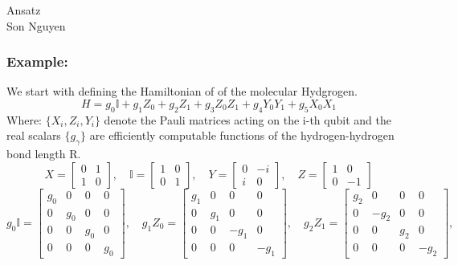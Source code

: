 \documentclass{article}
\begin{document}
\begin{center}
	\LARGE{Ansatz}\\[1em]
	\large Son Nguyen\\[1em]
\end{center}

\subsubsection*{Example:}
We start with defining the Hamiltonian of of the molecular Hydgrogen.
\[H = g_0 \mathbb{I} + g_1 Z_0 + g_2 Z_1 + g_3 Z_0 Z_1 + g_4 Y_0 Y_1 + g_5 X_0 X_ 1\]
Where: $\{X_i, Z_i, Y_i\}$ denote the Pauli matrices acting on the i-th qubit and the real scalars $\{g_\gamma\}$ are efficiently computable functions of the hydrogen-hydrogen bond length R.
\[
	X = \begin{bmatrix}
		0 & 1 \\
		1 & 0
	\end{bmatrix} , \quad
	\mathbb{I} = \begin{bmatrix}
		1 & 0 \\
		0 & 1
	\end{bmatrix}, \quad
	Y = \begin{bmatrix}
		0 & -i \\
		i & 0
	\end{bmatrix}, \quad
	Z = \begin{bmatrix}
		1 & 0  \\
		0 & -1
	\end{bmatrix}
\]
\[g_0 \mathbb{I} = \begin{bmatrix}
		g_0 & 0   & 0   & 0   \\
		0   & g_0 & 0   & 0   \\
		0   & 0   & g_0 & 0   \\
		0   & 0   & 0   & g_0
	\end{bmatrix}, \quad
	g_1 Z_0 = \begin{bmatrix}
		g_1 & 0   & 0    & 0    \\
		0   & g_1 & 0    & 0    \\
		0   & 0   & -g_1 & 0    \\
		0   & 0   & 0    & -g_1
	\end{bmatrix}, \quad
	g_2 Z_1 = \begin{bmatrix}
		g_2 & 0    & 0   & 0    \\
		0   & -g_2 & 0   & 0    \\
		0   & 0    & g_2 & 0    \\
		0   & 0    & 0   & -g_2
	\end{bmatrix}, \quad
\]
\end{document}
